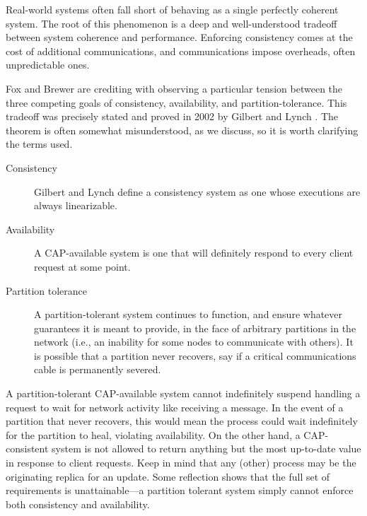 \documentclass[]             %
{NASA}                       %
\theoremstyle{definition}
\begin{document}
Real-world systems often fall short of behaving as a single perfectly
coherent system. The root of this phenomenon is a deep and
well-understood tradeoff between system coherence and performance.
Enforcing consistency comes at the cost of additional communications,
and communications impose overheads, often unpredictable ones.

Fox and Brewer \cite{1999foxbrewer} are crediting with observing a
particular tension between the three competing goals of consistency,
availability, and partition-tolerance. This tradeoff was precisely
stated and proved in 2002 by Gilbert and Lynch
\cite{2002gilbertlynchCAP}.  The theorem is often somewhat
misunderstood, as we discuss, so it is worth clarifying the terms
used.

\begin{description}
  \item[Consistency] Gilbert and Lynch define a consistency system as one whose executions
are always linearizable.
\item[Availability] A CAP-available system is one that will definitely respond to every
client request at some point.
\item[Partition tolerance]
A partition-tolerant system continues to function, and ensure whatever
guarantees it is meant to provide, in the face of arbitrary partitions
in the network (i.e., an inability for some nodes to communicate with
others). It is possible that a partition never recovers, say if a
critical communications cable is permanently severed.
\end{description}

A partition-tolerant CAP-available system cannot indefinitely suspend
handling a request to wait for network activity like receiving a
message. In the event of a partition that never recovers, this would
mean the process could wait indefinitely for the partition to heal,
violating availability. On the other hand, a CAP-consistent system is
not allowed to return anything but the most up-to-date value in
response to client requests. Keep in mind that any (other) process may
be the originating replica for an update. Some reflection shows that
the full set of requirements is unattainable---a partition tolerant
system simply cannot enforce both consistency and availability.
\end{document}
